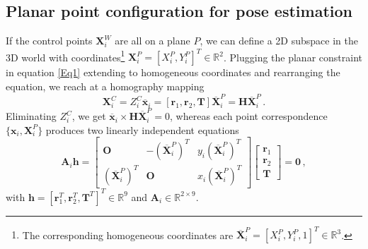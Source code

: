 \documentclass[letterpaper, 10 pt, conference]{ieeeconf}  %
\begin{document}
	\subsection{Planar point configuration for pose estimation}
	
	If the control points $\mathbf{X}_i^{W}$ are all on a plane $P$, we can define a 
	2D subspace in the 3D world with 
	coordinates\footnote{The corresponding homogeneous coordinates are 
		$\overline{\mathbf{X}}_i^{P} = [X_i^P, Y_i^P, 1]^T \in \mathbb{R}^3$.} 
	$\mathbf{X}_i^{P} = [X_i^P, Y_i^P]^T \in \mathbb{R}^2$.
	Plugging the planar constraint in equation \eqref{Eq1} extending to homogeneous coordinates and rearranging the equation, we reach at a homography mapping
	\begin{equation}
	\mathbf{X}_i^{C} = Z_i^C\overline{\mathbf{x}}_i = \left[\mathbf{r}_1, \mathbf{r}_2, \mathbf{T} \right]\overline{\mathbf{X}}_i^{P}
	= \mathbf{H}\overline{\mathbf{X}}_i^{P}\,.
	\end{equation}
	Eliminating $Z_i^C$, we get $\overline{\mathbf{x}}_i \times \mathbf{H}\overline{\mathbf{X}}_i^{P} = 0$, whereas
	each point correspondence $\{\mathbf{x}_i, \mathbf{X}_i^P\}$ produces two linearly independent equations
	\begin{equation}
	\mathbf{A}_i\mathbf{h} = 
	\begin{bmatrix}
	\mathbf{O} & -(\overline{\mathbf{X}}_i^P)^T & y_i(\overline{\mathbf{X}}_i^P)^T \\
	(\overline{\mathbf{X}}_i^P)^T & \mathbf{O} & x_i(\overline{\mathbf{X}}_i^P)^T 
	\end{bmatrix}
	\begin{bmatrix}
	\mathbf{r}_1 \\
	\mathbf{r}_2 \\
	\mathbf{T}
	\end{bmatrix}
	=\mathbf{0}\, ,
	\end{equation}
	with $\mathbf{h}=[\mathbf{r}_1^T, \mathbf{r}_2^T, \mathbf{T}^T]^T \in \mathbb{R}^{9}$ and $\mathbf{A}_i \in \mathbb{R}^{2 \times 9}$.
	
\end{document}
